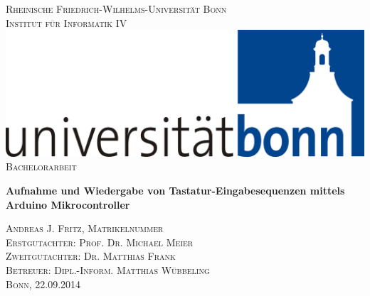 \documentclass[11pt, a4paper]{report}
\begin{document}
  \begin{titlepage}
    \thispagestyle{empty}
    \begin{center}
      \textsc{\large Rheinische Friedrich-Wilhelms-Universität Bonn}\\[1pc]
      \textsc{\large Institut für Informatik IV}\\[2pc]
      \includegraphics[scale=0.07]{images/logo}\\
      \vspace*{\fill}
      \textsc{\large Bachelorarbeit}\\[3pc]
      \begin{spacing}{2}
        \textbf{\LARGE Aufnahme und Wiedergabe von Tastatur-Eingabesequenzen mittels Arduino Mikrocontroller}\\[3pc]
      \end{spacing}
      \textsc{\large Andreas J. Fritz, Matrikelnummer}\\
      \vspace*{\fill}
      \textsc{\large Erstgutachter: Prof. Dr. Michael Meier}\\[1pc]
      \textsc{\large Zweitgutachter: Dr. Matthias Frank}\\[1pc]
      \textsc{\large Betreuer: Dipl.-Inform. Matthias Wübbeling}\\[1pc]
      \textsc{\large Bonn, 22.09.2014}
    \end{center}
  \end{titlepage}
\end{document}
